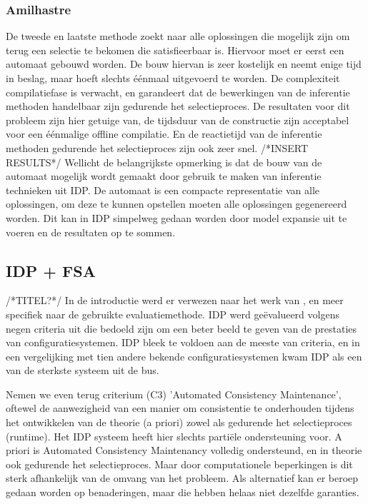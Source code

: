 \subsubsection{Amilhastre}
De tweede en laatste methode zoekt naar alle oplossingen die mogelijk zijn om terug een selectie te bekomen die satisfieerbaar is. Hiervoor moet er eerst een automaat gebouwd worden. De bouw hiervan is zeer kostelijk en neemt enige tijd in beslag, maar hoeft slechts \'{e}\'{e}nmaal uitgevoerd te worden. De complexiteit compilatiefase is verwacht, en garandeert dat de bewerkingen van de inferentie methoden handelbaar zijn gedurende het selectieproces. De resultaten voor dit probleem zijn hier getuige van, de tijdsduur van de constructie zijn acceptabel voor een \'{e}\'{e}nmalige offline compilatie. En de reactietijd van de inferentie methoden gedurende het selectieproces zijn ook zeer snel. /*INSERT RESULTS*/
Wellicht de belangrijkste opmerking is dat de bouw van de automaat mogelijk wordt gemaakt door gebruik te maken van inferentie technieken uit IDP. De automaat is een compacte representatie van alle oplossingen, om deze te kunnen opstellen moeten alle oplossingen gegenereerd worden. Dit kan in IDP simpelweg gedaan worden door model expansie uit te voeren en de resultaten op te sommen. 

\subsection{IDP + FSA} /*TITEL?*/
In de introductie werd er verwezen naar het werk van \citep{van2016kb}, en meer specifiek naar de gebruikte evaluatiemethode. IDP werd ge\"{e}valueerd volgens negen criteria uit \citep{felfernig2014knowledge} die bedoeld zijn om een beter beeld te geven van de prestaties van configuratiesystemen. IDP bleek te voldoen aan de meeste van criteria, en in een vergelijking met tien andere bekende configuratiesystemen kwam IDP als een van de sterkste systeem uit de bus. 

Nemen we even terug criterium (C3) 'Automated Consistency Maintenance', oftewel de aanwezigheid van een manier om consistentie te onderhouden tijdens het ontwikkelen van de theorie (a priori) zowel als gedurende het selectieproces (runtime). Het IDP systeem heeft hier slechts parti\"{e}le ondersteuning voor. A priori is Automated Consistency Maintenancy volledig ondersteund, en in theorie ook gedurende het selectieproces. Maar door computationele beperkingen is dit sterk afhankelijk van de omvang van het probleem. Als alternatief kan er beroep gedaan worden op benaderingen, maar die hebben helaas niet dezelfde garanties. 

